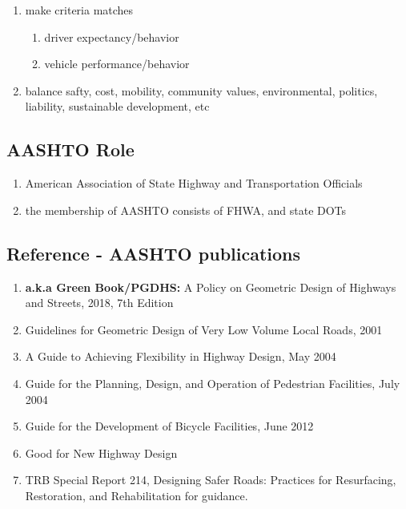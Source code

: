 \documentclass{article}
\begin{document}
  \begin{enumerate}
    \item make criteria matches  
    \begin{enumerate}
      \item driver expectancy/behavior
      \item vehicle performance/behavior
    \end{enumerate}
    \item balance safty, cost, mobility, community values, environmental, politics, liability, sustainable development, etc
  \end{enumerate}

  \subsection{AASHTO Role}
  \begin{enumerate}
    \item American Association of State Highway and Transportation Officials
    \item the membership of AASHTO consists of FHWA, and state DOTs
  \end{enumerate}

  \subsection{Reference - AASHTO publications}
  \begin{enumerate}
    \item \textbf{a.k.a Green Book/PGDHS:} A Policy on Geometric Design of Highways and Streets, 2018, 7th Edition
    \item Guidelines for Geometric Design of Very Low Volume Local Roads, 2001
    \item A Guide to Achieving Flexibility in Highway Design, May 2004
    \item Guide for the Planning, Design, and Operation of Pedestrian Facilities, July 2004
    \item Guide for the Development of Bicycle Facilities, June 2012

    \item Good for New Highway Design 
    \item TRB Special Report 214, Designing Safer Roads: Practices for Resurfacing, Restoration, and Rehabilitation for guidance. \\
  \end{enumerate}
\end{document}

